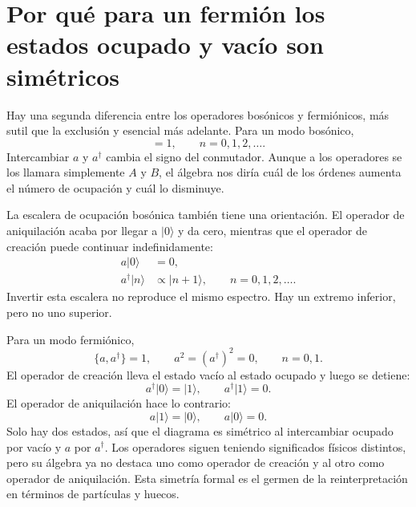 \section{Por qué para un fermión los estados ocupado y vacío son simétricos}

Hay una segunda diferencia entre los operadores bosónicos y fermiónicos, más sutil que la exclusión y esencial más adelante. Para un modo bosónico,
\begin{equation}
[a,a^\dagger]=1,
\qquad
n=0,1,2,\ldots.
\end{equation}
Intercambiar \(a\) y \(a^\dagger\) cambia el signo del conmutador. Aunque a los operadores se los llamara simplemente \(A\) y \(B\), el álgebra nos diría cuál de los órdenes aumenta el número de ocupación y cuál lo disminuye.

La escalera de ocupación bosónica también tiene una orientación. El operador de aniquilación acaba por llegar a \(\lvert0\rangle\) y da cero, mientras que el operador de creación puede continuar indefinidamente:
\begin{align}
a\lvert0\rangle&=0,\\
a^\dagger\lvert n\rangle&\propto\lvert n+1\rangle,
\qquad n=0,1,2,\ldots.
\end{align}
Invertir esta escalera no reproduce el mismo espectro. Hay un extremo inferior, pero no uno superior.

Para un modo fermiónico,
\begin{equation}
\{a,a^\dagger\}=1,
\qquad
a^2=(a^\dagger)^2=0,
\qquad
n=0,1.
\label{eq:l10-fermion-mode}
\end{equation}
El operador de creación lleva el estado vacío al estado ocupado y luego se detiene:
\begin{equation}
a^\dagger\lvert0\rangle=\lvert1\rangle,
\qquad
a^\dagger\lvert1\rangle=0.
\end{equation}
El operador de aniquilación hace lo contrario:
\begin{equation}
a\lvert1\rangle=\lvert0\rangle,
\qquad
a\lvert0\rangle=0.
\end{equation}
Solo hay dos estados, así que el diagrama es simétrico al intercambiar ocupado por vacío y \(a\) por \(a^\dagger\). Los operadores siguen teniendo significados físicos distintos, pero su álgebra ya no destaca uno como operador de creación y al otro como operador de aniquilación. Esta simetría formal es el germen de la reinterpretación en términos de partículas y huecos.

\begin{classroomqa}
\end{classroomqa}

